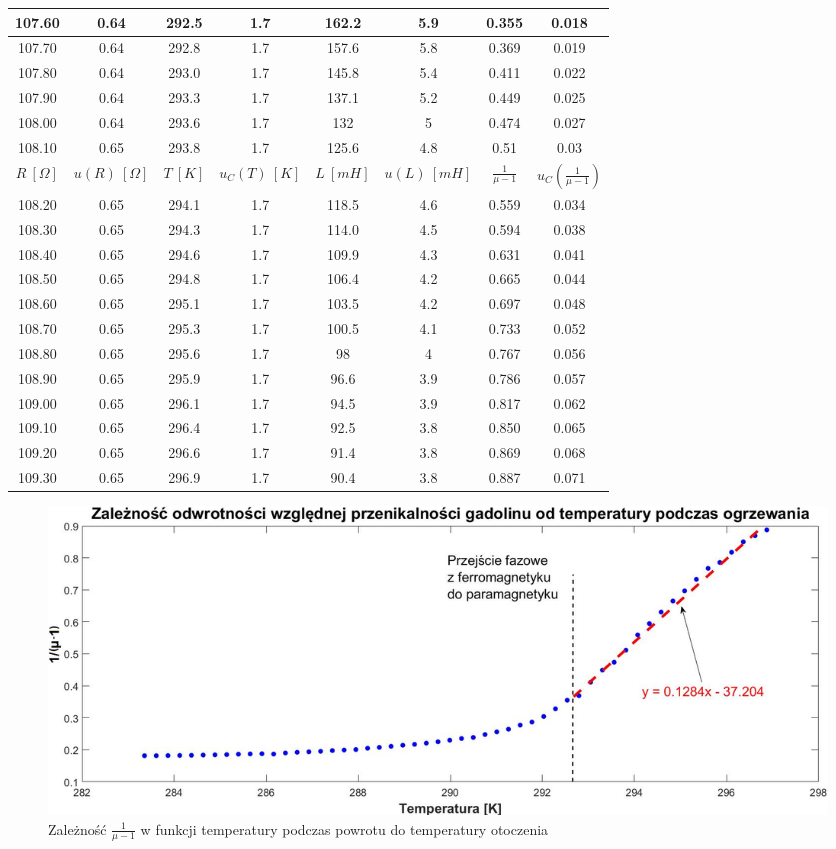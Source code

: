 \documentclass[12pt, a4paper, oneside]{article}
\begin{document}
\begin{longtable}[h]{|c|c|c|c|c|c|c|c|}
    107.60 & 0.64 & 292.5 & 1.7 & 162.2 & 5.9 & 0.355 & 0.018 \\\hline
    107.70 & 0.64 & 292.8 & 1.7 & 157.6 & 5.8 & 0.369 & 0.019 \\\hline
    107.80 & 0.64 & 293.0 & 1.7 & 145.8 & 5.4 & 0.411 & 0.022 \\\hline
    107.90 & 0.64 & 293.3 & 1.7 & 137.1 & 5.2 & 0.449 & 0.025 \\\hline
    108.00 & 0.64 & 293.6 & 1.7 & 132 & 5 & 0.474 & 0.027 \\\hline
    108.10 & 0.65 & 293.8 & 1.7 & 125.6 & 4.8 & 0.51 & 0.03 \\\hline
    $R~[\Omega]$ & $u(R)~[\Omega]$ & $T~[K]$ & $u_C(T)~[K]$ & $L~[mH]$ & 
    $u(L)~[mH]$ & $\frac{1}{\mu-1}$ & $u_C(\frac{1}{\mu-1})$ \\\hline
    108.20 & 0.65 & 294.1 & 1.7 & 118.5 & 4.6 & 0.559 & 0.034 \\\hline
    108.30 & 0.65 & 294.3 & 1.7 & 114.0 & 4.5 & 0.594 & 0.038 \\\hline
    108.40 & 0.65 & 294.6 & 1.7 & 109.9 & 4.3 & 0.631 & 0.041 \\\hline
    108.50 & 0.65 & 294.8 & 1.7 & 106.4 & 4.2 & 0.665 & 0.044 \\\hline
    108.60 & 0.65 & 295.1 & 1.7 & 103.5 & 4.2 & 0.697 & 0.048 \\\hline
    108.70 & 0.65 & 295.3 & 1.7 & 100.5 & 4.1 & 0.733 & 0.052 \\\hline
    108.80 & 0.65 & 295.6 & 1.7 & 98 & 4 & 0.767 & 0.056 \\\hline
    108.90 & 0.65 & 295.9 & 1.7 & 96.6 & 3.9 & 0.786 & 0.057 \\\hline
    109.00 & 0.65 & 296.1 & 1.7 & 94.5 & 3.9 & 0.817 & 0.062 \\\hline
    109.10 & 0.65 & 296.4 & 1.7 & 92.5 & 3.8 & 0.850 & 0.065 \\\hline
    109.20 & 0.65 & 296.6 & 1.7 & 91.4 & 3.8 & 0.869 & 0.068 \\\hline
    109.30 & 0.65 & 296.9 & 1.7 & 90.4 & 3.8 & 0.887 & 0.071 \\\hline
\end{longtable}
\begin{figure}[h]
\centering
\caption{Zależność $\frac{1}{\mu-1}$ w funkcji temperatury podczas powrotu do temperatury otoczenia}
\includegraphics[scale=0.4]{f2.png}
\end{figure}
\end{document}
